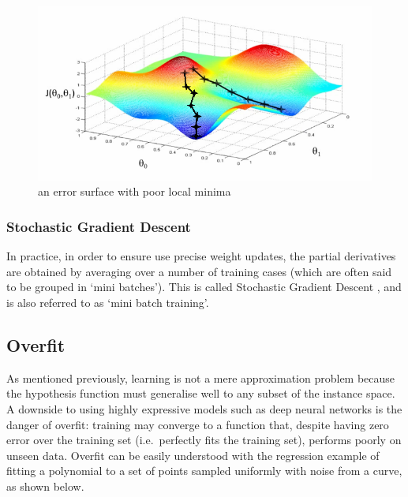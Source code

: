 \documentclass[a4paper,11pt]{article}
\begin{document}
\begin{figure}[h!]
	\centering
	\includegraphics[scale=0.8]{images/local_minima.png}
	\caption{an error surface with poor local minima}
\end{figure}


\subsubsection{Stochastic Gradient Descent}

In practice, in order to ensure use precise weight updates, the partial derivatives are obtained by averaging over a number of training cases (which are often said to be grouped in `mini batches'). This is called Stochastic Gradient Descent \cite{DL-book}, and is also referred to as `mini batch training'.


\subsection{Overfit}

As mentioned previously, learning is not a mere approximation problem because the hypothesis function must generalise well to any subset of the instance space. A downside to using highly expressive models such as deep neural networks is the danger of overfit: training may converge to a function that, despite having zero error over the training set (i.e.\ perfectly fits the training set), performs poorly on unseen data. Overfit can be easily understood with the regression example of fitting a polynomial to a set of points sampled uniformly with noise from a curve, as shown below. 
\end{document}
